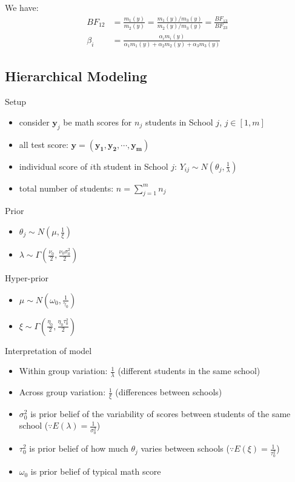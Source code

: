    We have:
    \begin{align*}
        BF_{12} &= \frac{m_1(y)}{m_2(y)} =
        \frac{m_1(y)/m_3(y)}{m_2(y)/m_3(y)} =
        \frac{BF_{13}}{BF_{23}}\\
        \beta_i &= \frac{\alpha_i m_i(y)}{\alpha_1 m_1(y) +
        \alpha_2 m_2(y) + \alpha_3 m_3(y)}
    \end{align*}

    \subsection{Hierarchical Modeling}

    Setup
    \begin{itemize}
        \item consider $\mathbf{y}_j$ be math scores for $n_j$
            students in School $j$, $j \in [1, m]$
        \item all test score: $\mathbf{y} = (\mathbf{y_1, y_2, \cdots, y_m})$
        \item individual score of $i$th student in School $j$:
            $Y_{ij} \sim N(\theta_j, \frac{1}{\lambda})$
        \item total number of students: $n = \sum_{j=1}^m n_j$
    \end{itemize}

    Prior
    \begin{itemize}
        \item $\theta_j \sim N(\mu, \frac{1}{\xi})$
        \item $\lambda \sim \Gamma(\frac{\nu_0}{2},
            \frac{\nu_0\sigma_0^2}{2})$
    \end{itemize}

    Hyper-prior
    \begin{itemize}
        \item $\mu \sim N(\omega_0, \frac{1}{\gamma_0})$
        \item $\xi \sim \Gamma(\frac{\eta_0}{2},
            \frac{\eta_0\tau_0^2}{2})$
    \end{itemize}

    Interpretation of model
    \begin{itemize}
        \item Within group variation: $\frac{1}{\lambda}$
            (different students in the same school)
        \item Across group variation: $\frac{1}{\xi}$
            (differences between schools)
        \item $\sigma_0^2$ is prior belief of the
            variability of scores between students of the
            same school ($\because E(\lambda) =
            \frac{1}{\sigma_0^2}$)
        \item $\tau_0^2$ is prior belief of how much
            $\theta_j$ varies between schools ($\because
            E(\xi) = \frac{1}{\tau_0^2}$)
        \item $\omega_0$ is prior belief of typical math
            score
    \end{itemize}


